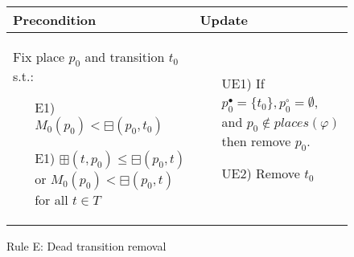 \begin{figure}[h!]
    \vspace{5mm}

    \begin{adjustbox}{center}
        \begin{tabular}{|p{79mm}|p{54mm}|} \hline
        Precondition & Update \\ \hline
        Fix place $p_0$ and transition $t_0$ s.t.:
        \begin{itemize}[leftmargin=10mm]
            \item[E1)] $M_0(p_0)<\boxminus(p_0, t_0)$
            \item[E1)] $\boxplus(t,p_0)\leq\boxminus(p_0, t)$ or $M_0(p_0)<\boxminus(p_0, t)$ for all $t\in T$
        \end{itemize} &
        \begin{itemize}[leftmargin=10mm]
            \item[UE1)] If $p_0^\bullet=\{t_0\},p_0^\circ=\emptyset$, and $p_0\notin places(\varphi)$ then remove $p_0$.
            \item[UE2)] Remove $t_0$
        \end{itemize} \\ \hline
        \end{tabular}
    \end{adjustbox}
    \caption{Rule E: Dead transition removal}
    \label{fig:rule_e}
\end{figure}